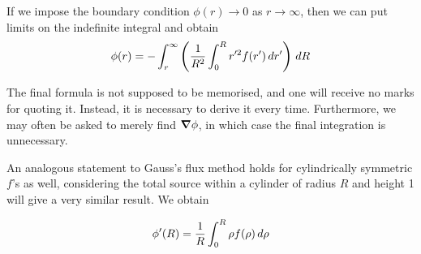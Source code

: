 \documentclass{../template/note}
\begin{document}
    \begin{remark*}
        If we impose the boundary condition \(\phi(r) \to 0\) as \(r \to \infty\), then we can put limits on the indefinite integral and obtain
        \begin{align*}
            \phi(r) = -\int_r^\infty \left(\frac 1{R^2} \int_0^R r'^2 f(r') \,d{r}'\right) \,d{R}
        \end{align*}
    \end{remark*}
    
    \begin{remark*}
        The final formula is not supposed to be memorised, and one will receive no marks for quoting it. Instead, it is necessary to derive it every time. Furthermore, we may often be asked to merely find \(\grad \phi\), in which case the final integration is unnecessary.
    \end{remark*}
    
    An analogous statement to Gauss's flux method holds for cylindrically symmetric \(f\)'s as well, considering the total source within a cylinder of radius \(R\) and height 1 will give a very similar result. We obtain

    \begin{align*}
        \phi'(R) = \frac 1 R \int_0^R \rho f(\rho) \,d{\rho}
    \end{align*}
    
\end{document}
